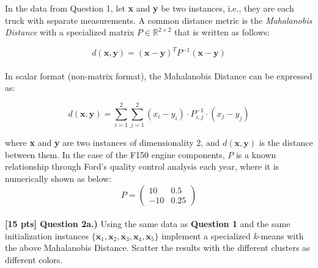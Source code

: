 \documentclass[paper=a4, fontsize=11pt]{scrartcl} %
\begin{document}
In the data from Question 1, let \textbf{x} and \textbf{y} be two instances, i.e., they are each truck with separate measurements.  A common distance metric is the \emph{Mahalanobis Distance} with a specialized matrix $P \in \mathbb{R}^{2 \times 2}$ that is written as follows: 

\begin{equation}
d(\textbf{x}, \textbf{y}) = ( \textbf{x} - \textbf{y} )^T P^{-1} ( \textbf{x} - \textbf{y} )
\nonumber
\end{equation} \\

In scalar format (non-matrix format), the Mahalanobis Distance can be expressed as:

\begin{equation}
    d(\textbf{x}, \textbf{y}) = \sum_{i=1}^2 \sum_{j=1}^2 (x_i - y_i) \cdot P^{-1}_{i,j} \cdot (x_j - y_j)
    \nonumber
\end{equation}

where \textbf{x} and \textbf{y} are two instances of dimensionality 2, and $d(\textbf{x}, \textbf{y})$ is the distance between them. In the case of the F150 engine components, $P$ is a known relationship through Ford's quality control analysis each year, where it is numerically shown as below: \\

\begin{equation}
 P = \left(
\begin{matrix}
10 & 0.5 \\
-10 & 0.25
\end{matrix}
\right) \nonumber
\end{equation}
\\

\textbf{[15 pts] Question 2a.)} Using the same data as \textbf{Question 1} and the same initialization instances $\{\textbf{x}_1, \textbf{x}_2, \textbf{x}_3, \textbf{x}_4, \textbf{x}_5 \}$ implement a specialized $k$-means with the above Mahalanobis Distance. Scatter the results with the different clusters as different colors. \\
\end{document}
